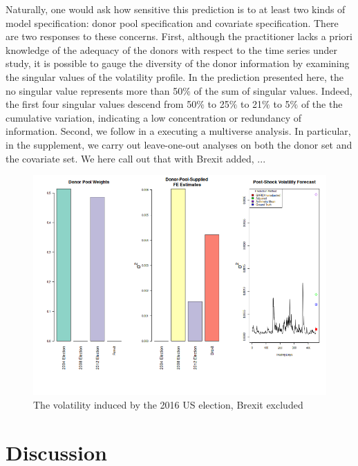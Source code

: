 \documentclass[11pt]{article}
\theoremstyle{definition}
\begin{document}
Naturally, one would ask how sensitive this prediction is to at least two kinds of model specification: donor pool specification and covariate specification.  There are two responses to these concerns.  First, although the practitioner lacks a priori knowledge of the adequacy of the donors with respect to the time series under study, it is possible to gauge the diversity of the donor information by examining the singular values of the volatility profile.  In the prediction presented here, the no singular value represents more than 50$\%$ of the sum of singular values.  Indeed, the first four singular values descend from 50$\%$ to 25$\%$ to 21$\%$ to 5$\%$ of the the cumulative variation, indicating a low concentration or redundancy of information.  Second, we follow \citet{steegen2016increasing} in a executing a multiverse analysis.  In particular, in the supplement, we carry out leave-one-out analyses on both the donor set and the covariate set.  We here call out that with Brexit added, ...

\begin{figure}[h!]
\begin{center}
  \includegraphics[scale=.6]{real_data_output_plots/savetime_WedJan1010:53:23PM2024_IYG_CL=F-^VIX-^IRX-^FVX-^TNX-^TYX_^VIX_2016-11-08-2004-11-02-2008-11-04-2012-11-06-2016-06-23.png}
  \caption{The volatility induced by the 2016 US election, Brexit excluded}
  \label{fig:SVF_2016_without_Brexit}
  \end{center}
\end{figure}

\section{Discussion}
\end{document}
